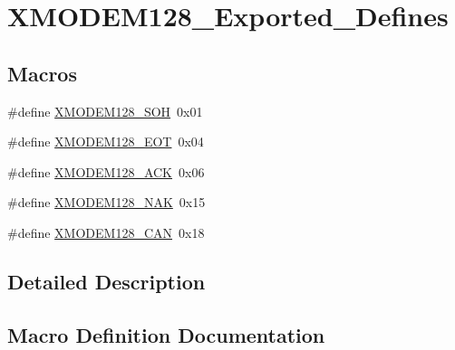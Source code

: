 \hypertarget{group___x_m_o_d_e_m128___exported___defines}{}\section{X\+M\+O\+D\+E\+M128\+\_\+\+Exported\+\_\+\+Defines}
\label{group___x_m_o_d_e_m128___exported___defines}
\subsection*{Macros}
\begin{DoxyCompactItemize}
\item 
\#define \mbox{\hyperlink{group___x_m_o_d_e_m128___exported___defines_gae18ee26e2806d368ce3917495a1eea35}{X\+M\+O\+D\+E\+M128\+\_\+\+S\+OH}}~0x01
\item 
\#define \mbox{\hyperlink{group___x_m_o_d_e_m128___exported___defines_ga58c8c951dd64e2ac3c55e9349161e83f}{X\+M\+O\+D\+E\+M128\+\_\+\+E\+OT}}~0x04
\item 
\#define \mbox{\hyperlink{group___x_m_o_d_e_m128___exported___defines_ga91186b9eed76278e60d5e89afe433170}{X\+M\+O\+D\+E\+M128\+\_\+\+A\+CK}}~0x06
\item 
\#define \mbox{\hyperlink{group___x_m_o_d_e_m128___exported___defines_gae9837d569d0f7301f6127cbd40565109}{X\+M\+O\+D\+E\+M128\+\_\+\+N\+AK}}~0x15
\item 
\#define \mbox{\hyperlink{group___x_m_o_d_e_m128___exported___defines_gacad3b5a81a9ab07952ae6352f4c1f5e8}{X\+M\+O\+D\+E\+M128\+\_\+\+C\+AN}}~0x18
\end{DoxyCompactItemize}


\subsection{Detailed Description}


\subsection{Macro Definition Documentation}
\mbox{\label{group___x_m_o_d_e_m128___exported___defines_ga91186b9eed76278e60d5e89afe433170}} 
